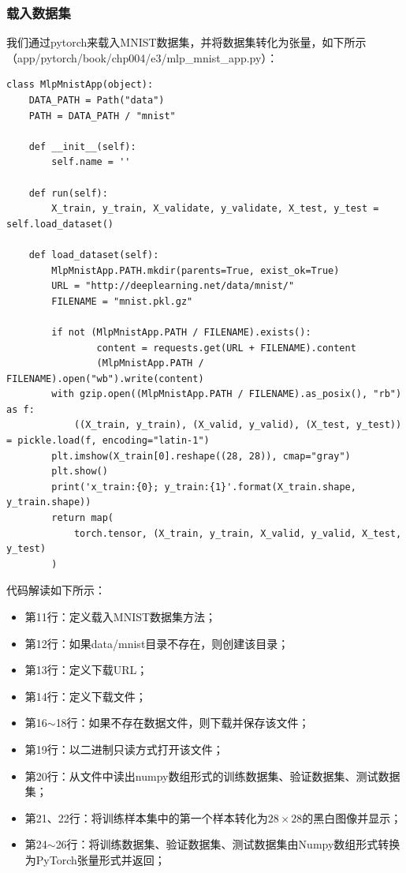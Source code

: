 \documentclass[UTF8]{article}
\begin{document}
\subsubsection{载入数据集}
我们通过pytorch来载入MNIST数据集，并将数据集转化为张量，如下所示（app/pytorch/book/chp004/e3/mlp\_mnist\_app.py）：
\begin{lstlisting}
class MlpMnistApp(object):
    DATA_PATH = Path("data")
    PATH = DATA_PATH / "mnist"

    def __init__(self):
        self.name = ''

    def run(self):
        X_train, y_train, X_validate, y_validate, X_test, y_test = self.load_dataset()

    def load_dataset(self):
        MlpMnistApp.PATH.mkdir(parents=True, exist_ok=True)
        URL = "http://deeplearning.net/data/mnist/"
        FILENAME = "mnist.pkl.gz"

        if not (MlpMnistApp.PATH / FILENAME).exists():
                content = requests.get(URL + FILENAME).content
                (MlpMnistApp.PATH / FILENAME).open("wb").write(content)
        with gzip.open((MlpMnistApp.PATH / FILENAME).as_posix(), "rb") as f:
            ((X_train, y_train), (X_valid, y_valid), (X_test, y_test)) = pickle.load(f, encoding="latin-1")
        plt.imshow(X_train[0].reshape((28, 28)), cmap="gray")
        plt.show()
        print('x_train:{0}; y_train:{1}'.format(X_train.shape, y_train.shape))
        return map(
            torch.tensor, (X_train, y_train, X_valid, y_valid, X_test, y_test)
        )
\end{lstlisting}
代码解读如下所示：
\begin{itemize}
\item 第11行：定义载入MNIST数据集方法；
\item 第12行：如果data/mnist目录不存在，则创建该目录；
\item 第13行：定义下载URL；
\item 第14行：定义下载文件；
\item 第16$\sim$18行：如果不存在数据文件，则下载并保存该文件；
\item 第19行：以二进制只读方式打开该文件；
\item 第20行：从文件中读出numpy数组形式的训练数据集、验证数据集、测试数据集；
\item 第21、22行：将训练样本集中的第一个样本转化为$28 \times 28$的黑白图像并显示；
\item 第24$\sim$26行：将训练数据集、验证数据集、测试数据集由Numpy数组形式转换为PyTorch张量形式并返回；
\end{itemize}
\end{document}
